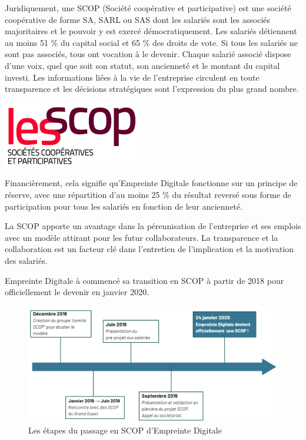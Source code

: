 \documentclass[12pt]{article}
\begin{document}
\noindent%
\begin{minipage}{.7\textwidth}%
Juridiquement, une \gls{SCOP} (Société coopérative et participative) est une société coopérative de forme \gls{SA}, \gls{SARL} ou \gls{SAS} dont les salariés sont les associés majoritaires et le pouvoir y est exercé démocratiquement.
Les salariés détiennent au moins 51 \% du capital social et 65 \% des droits de vote. 
Si tous les salariés ne sont pas associés, tous ont vocation à le devenir. 
Chaque salarié associé dispose d’une voix, quel que soit son statut, son ancienneté et le montant du capital investi.
Les informations liées à la vie de l’entreprise circulent en toute transparence et les décisions stratégiques sont l’expression du plus grand nombre. \cite{Scop} \\
\end{minipage}%
\hfill
\begin{minipage}{.3\textwidth}%
\begin{center}
    \includegraphics[scale=0.7]{src/logo_scop.png}
\end{center}
\end{minipage}%

Financièrement, cela signifie qu'Empreinte Digitale fonctionne sur un principe de réserve, avec une répartition d'au moins 25 \% du résultat reversé sous forme de participation pour tous les salariés en fonction de leur ancienneté.

La \gls{SCOP} apporte un avantage dans la pérennisation de l'entreprise et ses emplois avec un modèle attirant pour les futur collaborateurs. 
La transparence et la collaboration est un facteur clé dans l'entretien de l'implication et la motivation des salariés.

Empreinte Digitale à commencé sa transition en \gls{SCOP} à partir de 2018 pour officiellement le devenir en janvier 2020.
\begin{figure}[!ht]
    \centering
    \includegraphics[width=\textwidth]{src/graph_scop.png}
    \caption{Les étapes du passage en \gls{SCOP} d'Empreinte Digitale}
    \label{fig:transition_scop}
\end{figure}
\end{document}

